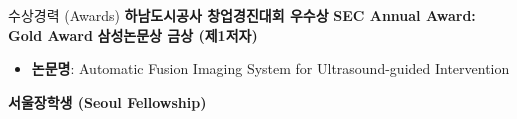 \begin{rubric}{수상경력 (Awards)}
    \entry*[2022] \textbf{하남도시공사 창업경진대회 우수상}
    \entry*[2015] \textbf{SEC Annual Award: Gold Award}
    \entry*[2014] \textbf{삼성논문상 금상 (제1저자)}
        \begin{itemize}[leftmargin=1em, itemsep=0em, labelsep=0.5em,topsep=0.5em]
            \item \textbf{논문명}: Automatic Fusion Imaging System for Ultrasound-guided Intervention
        \end{itemize}
        \vspace{1em}
    \entry*[2009] \textbf{서울장학생 (Seoul Fellowship)}
\end{rubric}